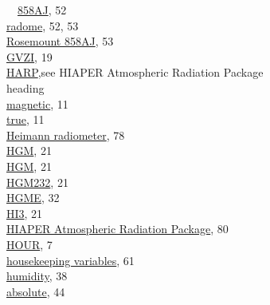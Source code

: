 \documentclass[
]{article}
\begin{document}
~~\href{./4-the-state-of-the-atmosphere.html\#relative-wind}{858AJ},
52\\
\hspace*{0.333em}\hspace*{0.333em}\href{./4-the-state-of-the-atmosphere.html\#relative-wind}{radome},
52, 53\\
\hspace*{0.333em}\hspace*{0.333em}\href{./4-the-state-of-the-atmosphere.html\#relative-wind}{Rosemount
858AJ}, 53\\
\href{./3-the-state-of-the-aircraft.html\#ggvspd}{GVZI}, 19\\
\href{./8-radiation-variables.html\#harp}{HARP},see HIAPER Atmospheric
Radiation Package\\
heading\\
\hspace*{0.333em}\hspace*{0.333em}\href{./3-the-state-of-the-aircraft.html\#thdg}{magnetic},
11\\
\hspace*{0.333em}\hspace*{0.333em}\href{./3-the-state-of-the-aircraft.html\#thdg}{true},
11\\
\href{./8-radiation-variables.html\#rstx}{Heimann radiometer}, 78\\
\href{./3-the-state-of-the-aircraft.html\#hgm}{HGM}, 21\\
\href{./3-the-state-of-the-aircraft.html\#hgme-159}{HGM}, 21\\
\href{./3-the-state-of-the-aircraft.html\#hgm-232}{HGM232}, 21\\
\href{./3-the-state-of-the-aircraft.html\#hgme-159}{HGME}, 32\\
\href{./3-the-state-of-the-aircraft.html\#hi3}{HI3}, 21\\
\href{./7-aerosol-particle-measurements.html\#harp}{HIAPER Atmospheric
Radiation Package}, 80\\
\href{./2-general-information-about-data-files.html\#hms\%7C}{HOUR}, 7\\
\href{./5-cloud-physics-variables.html\#sensors-1-D-probes}{housekeeping
variables}, 61\\
\href{./4-the-state-of-the-atmosphere.html\#humidity}{humidity}, 38\\
\hspace*{0.333em}\hspace*{0.333em}\href{./4-the-state-of-the-atmosphere.html\#rho}{absolute},
44\\
\end{document}

